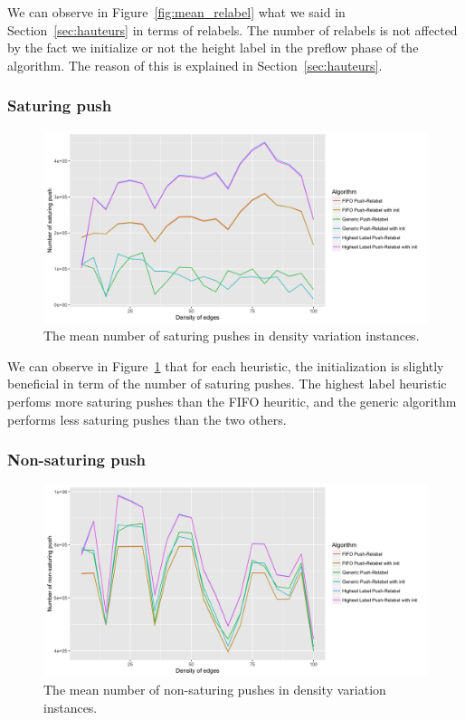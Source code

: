 We can observe in Figure~\ref{fig:mean_relabel} what we said in Section~\ref{sec:hauteurs} in terms of relabels. The number of relabels is not affected by the fact we initialize or not the height label in the preflow phase of the algorithm. The reason of this is explained in Section~\ref{sec:hauteurs}.

\subsubsection{Saturing push}
\begin{figure}[H]
\begin{center}
\includegraphics[scale=0.13]{images/meansaturingpushes.png}
\caption{The mean number of saturing pushes in density variation instances.}
\label{fig:mean_sat}
\end{center}
\end{figure}

We can observe in Figure~\ref{fig:mean_sat} that for each heuristic, the initialization is slightly beneficial in term of the number of saturing pushes. The highest label heuristic perfoms more saturing pushes than the FIFO heuritic, and the generic algorithm performs less saturing pushes than the two others.


\subsubsection{Non-saturing push}

\begin{figure}[H]
\begin{center}
\includegraphics[scale=0.13]{images/meannonsaturingpushes.png}
\caption{The mean number of non-saturing pushes in density variation instances.}
\label{fig:mean_non_sat}
\end{center}
\end{figure}

